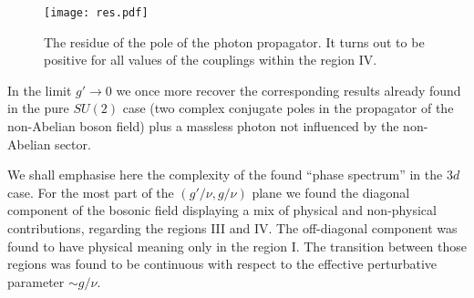 
\begin{figure} \begin{center}
\texttt{[image: res.pdf]}
\caption{The residue of the pole of the photon propagator. It turns out to be positive for all values of the couplings within the region IV. \label{resrealmass}}
\end{center} \end{figure}


In the limit $g'\to0$ we once more recover the corresponding results already found in the pure $SU(2)$ case \cite{Capri:2012cr} (two complex conjugate poles in the propagator of the non-Abelian boson field) plus a massless photon not influenced by the non-Abelian sector.



We shall emphasise here the complexity of the found ``phase spectrum'' in the $3d$ case. For the most part of the $(g'/\nu, g/\nu)$ plane we found the diagonal component of the bosonic field displaying a mix of physical and non-physical contributions, regarding the regions III and IV. The off-diagonal component was found to have physical meaning only in the region I. The transition between those regions was found to be continuous with respect to the effective perturbative parameter $\sim g/\nu$.



















